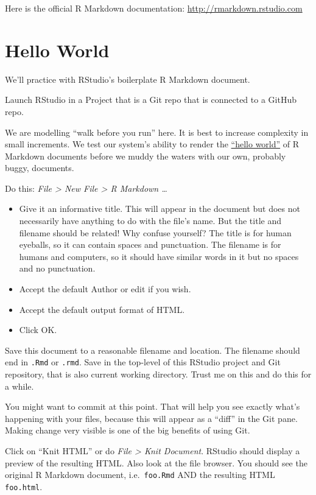 \documentclass[
]{book}
\providecommand{\tightlist}{%
  \setlength{\itemsep}{0pt}\setlength{\parskip}{0pt}}
\begin{document}
Here is the official R Markdown documentation: \url{http://rmarkdown.rstudio.com}

\section{Hello World}\label{hello-world}

We'll practice with RStudio's boilerplate R Markdown document.

Launch RStudio in a Project that is a Git repo that is connected to a GitHub repo.

We are modelling ``walk before you run'' here.
It is best to increase complexity in small increments.
We test our system's ability to render the \href{http://en.wikipedia.org/wiki/\%22Hello,_world!\%22_program}{``hello world''} of R Markdown documents before we muddy the waters with our own, probably buggy, documents.

Do this: \emph{File \textgreater{} New File \textgreater{} R Markdown \ldots{}}

\begin{itemize}
\tightlist
\item
  Give it an informative title. This will appear in the document but does not
  necessarily have anything to do with the file's name. But the title and
  filename should be related! Why confuse yourself? The title is for human
  eyeballs, so it can contain spaces and punctuation. The filename is for humans
  and computers, so it should have similar words in it but no spaces and no
  punctuation.
\item
  Accept the default Author or edit if you wish.
\item
  Accept the default output format of HTML.
\item
  Click OK.
\end{itemize}

Save this document to a reasonable filename and location.
The filename should end in \texttt{.Rmd} or \texttt{.rmd}.
Save in the top-level of this RStudio project and Git repository, that is also current working directory.
Trust me on this and do this for a while.

You might want to commit at this point.
That will help you see exactly what's happening with your files, because this will appear as a ``diff'' in the Git pane.
Making change very visible is one of the big benefits of using Git.

Click on ``Knit HTML'' or do \emph{File \textgreater{} Knit Document}.
RStudio should display a preview of the resulting HTML.
Also look at the file browser.
You should see the original R Markdown document, i.e.~\texttt{foo.Rmd} AND the resulting HTML \texttt{foo.html}.
\end{document}
